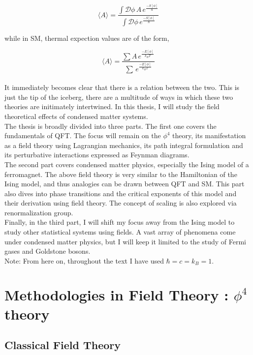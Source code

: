 \documentclass[12pt]{report}
\begin{document}
$$\langle A\rangle= \frac{\int \mathcal{D}\phi \,A \,e^{\frac{-S[\phi]}{\hbar}}}{\int \mathcal{D}\phi \,e^{\frac{-S[\phi]}{\hbar}}}$$ 

\noindent while in SM, thermal expection values are of the form,

$$\langle A\rangle= \frac{\sum A \,e^{\frac{-E[\phi]}{k_BT}}}{\sum \,e^{\frac{-E[\phi]}{k_BT}}}$$ \\

\noindent It immediately becomes clear that there is a relation between the two. This is just the tip of the iceberg, there are a multitude of ways in which these two theories are initimately intertwined. In this thesis, I will study the field theoretical effects of condensed matter systems. \\

\noindent The thesis is broadly divided into three parts. The first one covers the fundamentals of QFT. The focus will remain on the $\phi^4$ theory, its manifestation as a field theory using Lagrangian mechanics, its path integral formulation and its perturbative interactions expressed as Feynman diagrams. \\

\noindent The second part covers condensed matter physics, especially the Ising model of a ferromagnet. The above field theory is very similar to the Hamiltonian of the Ising model, and thus analogies can be drawn between QFT and SM. This part also dives into phase transitions and the critical exponents of this model and their derivation using field theory. The concept of scaling is also explored via renormalization group.\\

\noindent Finally, in the third part, I will shift my focus away from the Ising model to study other statistical systems using fields. A vast array of phenomena come under condensed matter physics, but I will keep it limited to the study of Fermi gases and Goldstone bosons.\\

\noindent Note: From here on, throughout the text I have used $\hbar=c=k_B=1$.

\tableofcontents

\part{Methodologies in Field Theory : $\phi^4$ theory}

\chapter{Classical Field Theory}

\end{document}
